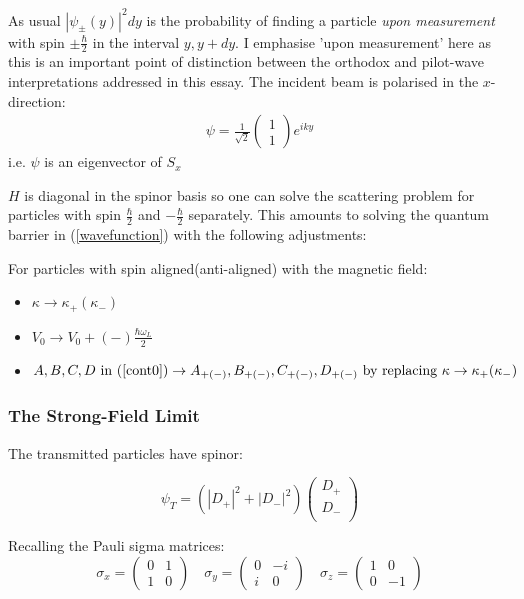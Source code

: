 \documentclass{article}
\begin{document}
As usual $|\psi_{\pm}(y)|^{2}dy$ is the probability of finding a particle \textit{upon measurement} with spin $\pm \frac{\hbar}{2}$ in the interval $y, y+dy$. I emphasise 'upon measurement' here as this is an important point of distinction between the orthodox and pilot-wave interpretations addressed in this essay. The incident beam is polarised in the $x$-direction:
\begin{align}
	\psi = \frac{1}{\sqrt{2}}
	\begin{pmatrix}
	1\\
	1
	\end{pmatrix}
	e^{iky}
\end{align}
i.e. $\psi$ is an eigenvector of $S_{x}$

\noindent $H$ is diagonal in the spinor basis so one can solve the scattering problem for particles with spin $\frac{\hbar}{2}$ and $-\frac{\hbar}{2}$ separately. This amounts to solving the quantum barrier in (\ref{wavefunction}) with the following adjustments:

For particles with spin aligned(anti-aligned) with the magnetic field:

\begin{itemize}
	\item $\kappa \to \kappa_{+}(\kappa_{-})$
	\item $V_0 \to V_0+(-)\frac{\hbar \omega_L}{2}$
	\item $A,B,C,D \text{ in } (\ref{cont0}) \to A_{+(-)},B_{+(-)},C_{+(-)},D_{+(-)} \text{ by replacing } \kappa \to \kappa_{+}(\kappa_{-})$
\end{itemize}

\subsubsection{The Strong-Field Limit}
The transmitted particles have spinor:

\begin{equation}
	\psi_T = (|D_{+}|^2+|D_{-}|^2)
	\begin{pmatrix}
		D_{+}\\
		D_{-}\\
	\end{pmatrix}
\end{equation}

\noindent Recalling the Pauli sigma matrices:
\begin{equation}
	\sigma_x = 
	\begin{pmatrix}
		0&1\\
		1&0
	\end{pmatrix} \quad
	\sigma_y = 
	\begin{pmatrix}
		0&-i\\
		i&0
	\end{pmatrix} \quad
	\sigma_z =
	\begin{pmatrix}
		1&0\\
		0&-1
	\end{pmatrix}
\end{equation}
\end{document}
